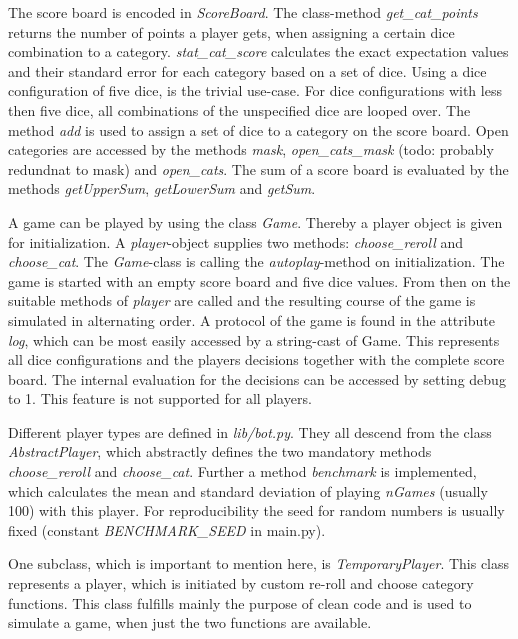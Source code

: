 \documentclass{article}
\begin{document}
The score board is encoded in \emph{ScoreBoard}.
The class-method \emph{get\_cat\_points} returns the number of points a player gets,
when assigning a certain dice combination to a category.
\emph{stat\_cat\_score} calculates the exact expectation values and their standard error for each category
based on a set of dice. Using a dice configuration of five dice, is the trivial use-case.
For dice configurations with less then five dice, all combinations of the unspecified dice are looped over.
The method \emph{add} is used to assign a set of dice to a category on the score board.
Open categories are accessed by the methods \emph{mask}, \emph{open\_cats\_mask} (todo: probably redundnat to mask)
and \emph{open\_cats}.
The sum of a score board is evaluated by the methods \emph{getUpperSum}, \emph{getLowerSum} and \emph{getSum}.

A game can be played by using the class \emph{Game}.
Thereby a player object is given for initialization.
A \emph{player}-object supplies two methods: \emph{choose\_reroll} and \emph{choose\_cat}.
The \emph{Game}-class is calling the \emph{autoplay}-method on initialization.
The game is started with an empty score board and five dice values.
From then on the suitable methods of \emph{player} are called and the resulting course of the game is simulated in alternating order.
A protocol of the game is found in the attribute \emph{log},
which can be most easily accessed by a string-cast of Game.
This represents all dice configurations and the players decisions together with the complete score board.
The internal evaluation for the decisions can be accessed by setting debug to 1.
This feature is not supported for all players.

Different player types are defined in \emph{lib/bot.py}.
They all descend from the class \emph{AbstractPlayer},
which abstractly defines the two mandatory methods \emph{choose\_reroll} and \emph{choose\_cat}.
Further a method \emph{benchmark} is implemented, 
which calculates the mean and standard deviation of playing \emph{nGames} (usually 100)
with this player.
For reproducibility the seed for random numbers is usually fixed
(constant \emph{BENCHMARK\_SEED} in main.py).

One subclass, which is important to mention here, is \emph{TemporaryPlayer}.
This class represents a player,
which is initiated by custom re-roll and choose category functions.
This class fulfills mainly the purpose of clean code and 
is used to simulate a game, when just the two functions are available.
\end{document}
